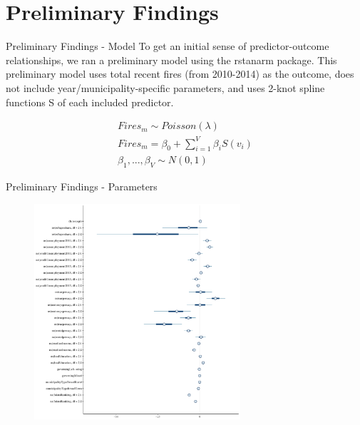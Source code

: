 \documentclass{beamer}
\begin{document}
%

%
%	





\section{Preliminary Findings}
\begin{frame}{Preliminary Findings - Model}
To get an initial sense of predictor-outcome relationships, we ran a preliminary model using the rstanarm package. This preliminary model uses total recent fires (from 2010-2014) as the outcome, does not include year/municipality-specific parameters, and uses 2-knot spline functions S of each included predictor.

\begin{align*}
Fires_{m} \sim Poisson(\lambda) \\
Fires_{m} = \beta_0 + \sum_{i=1}^V \beta_i S(v_i) \\
\beta_1,...,\beta_V \sim N(0,1)
\end{align*}
\end{frame}

\begin{frame}{Preliminary Findings - Parameters}

\begin{figure}
\centering
\includegraphics[width=.6\linewidth,height=8cm]{parameterintervals.pdf}
\end{figure}

\end{frame}
\end{document}
